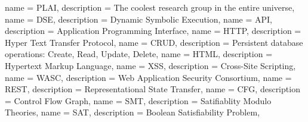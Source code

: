 {
  name = PLAI,
  description = {The coolest research group in the entire universe},
}
{
  name = DSE,
  description = {Dynamic Symbolic Execution},
}
{
  name = API,
  description = {Application Programming Interface},
}
{
  name = HTTP,
  description = {Hyper Text Transfer Protocol},
}
{
  name = CRUD,
  description = {Persistent database operations: Create, Read, Update, Delete},
}
{
  name = HTML,
  description = {Hypertext Markup Language},
}
{
  name = XSS,
  description = {Cross-Site Scripting},
}
{
  name = WASC,
  description = {Web Application Security Consortium},
}
{
  name = REST,
  description = {Representational State Transfer},
}
{
  name = CFG,
  description = {Control Flow Graph},
}
{
  name = SMT,
  description = {Satifiablity Modulo Theories},
}
{
  name = SAT,
  description = {Boolean Satisfiability Problem},
}